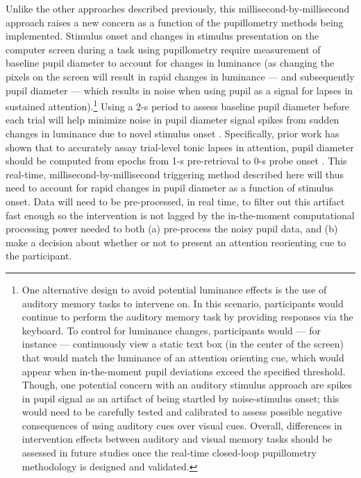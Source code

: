 Unlike the other approaches described previously, this millisecond-by-millisecond approach raises a new concern as a function of the pupillometry methods being implemented. Stimulus onset and changes in stimulus presentation on the computer screen during a task using pupillometry require measurement of baseline pupil diameter to account for changes in luminance (as changing the pixels on the screen will result in rapid changes in luminance --- and subsequently pupil diameter --- which results in noise when using pupil as a signal for lapses in sustained attention).\footnote{One alternative design to avoid potential luminance effects is the use of auditory memory tasks to intervene on. In this scenario, participants would continue to perform the auditory memory task by providing responses via the keyboard. To control for luminance changes, participants would --- for instance --- continuously view a static text box (in the center of the screen) that would match the luminance of an attention orienting cue, which would appear when in-the-moment pupil deviations exceed the specified threshold. Though, one potential concern with an auditory stimulus approach are spikes in pupil signal as an artifact of being startled by noise-stimulus onset; this would need to be carefully tested and calibrated to assess possible negative consequences of using auditory cues over visual cues. Overall, differences in intervention effects between auditory and visual memory tasks should be assessed in future studies once the real-time closed-loop pupillometry methodology is designed and validated.} Using a 2-s period to assess baseline pupil diameter before each trial will help minimize noise in pupil diameter signal spikes from sudden changes in luminance due to novel stimulus onset \parencite{unsworth2017importance}. Specifically, prior work has shown that to accurately assay trial-level tonic lapses in attention, pupil diameter should be computed from epochs from 1-s pre-retrieval to 0-s probe onset \parencite{madore2020memory,unsworth2016pupillary,unsworth2017importance,unsworth2018tracking}. This real-time, millisecond-by-millisecond triggering method described here will thus need to account for rapid changes in pupil diameter as a function of stimulus onset. Data will need to be pre-processed, in real time, to filter out this artifact fast enough so the intervention is not lagged by the in-the-moment computational processing power needed to both (a) pre-process the noisy pupil data, and (b) make a decision about whether or not to present an attention reorienting cue to the participant.


